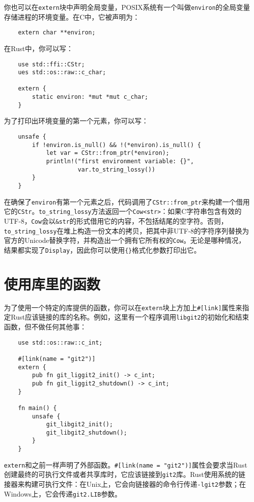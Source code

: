 你也可以在\texttt{extern}块中声明全局变量，POSIX系统有一个叫做\texttt{environ}的全局变量存储进程的环境变量。在C中，它被声明为：
\begin{verbatim}
    extern char **environ;
\end{verbatim}

在Rust中，你可以写：
\begin{verbatim}
    use std::ffi::CStr;
    ues std::os::raw::c_char;

    extern {
        static environ: *mut *mut c_char;
    }
\end{verbatim}

为了打印出环境变量的第一个元素，你可以写：
\begin{verbatim}
    unsafe {
        if !environ.is_null() && !(*environ).is_null() {
            let var = CStr::from_ptr(*environ);
            println!("first environment variable: {}",
                     var.to_string_lossy())
        }
    }
\end{verbatim}

在确保了\texttt{environ}有第一个元素之后，代码调用了\texttt{CStr::from\_ptr}来构建一个借用它的\texttt{CStr}。\texttt{to\_string\_lossy}方法返回一个\texttt{Cow<str>}：如果C字符串包含有效的UTF-8，\texttt{Cow}会以\texttt{\&str}的形式借用它的内容，不包括结尾的空字符。否则，\texttt{to\_string\_lossy}在堆上构造一份文本的拷贝，把其中非UTF-8的字符序列替换为官方的Unicode替换字符，并构造出一个拥有它所有权的\texttt{Cow}。无论是哪种情况，结果都实现了\texttt{Display}，因此你可以使用\texttt{\{\}}格式化参数打印出它。

\section{使用库里的函数}
为了使用一个特定的库提供的函数，你可以在\texttt{extern}块上方加上\texttt{\#[link]}属性来指定Rust应该链接的库的名称。例如，这里有一个程序调用\texttt{libgit2}的初始化和结束函数，但不做任何其他事：
\begin{verbatim}
    use std::os::raw::c_int;

    #[link(name = "git2")]
    extern {
        pub fn git_liggit2_init() -> c_int;
        pub fn git_liggit2_shutdown() -> c_int;
    }

    fn main() {
        unsafe {
            git_libgit2_init();
            git_libgit2_shutdown();
        }
    }
\end{verbatim}

\texttt{extern}和之前一样声明了外部函数。\texttt{\#[link(name = "git2")]}属性会要求当Rust创建最终的可执行文件或者共享库时，它应该链接到\texttt{git2}库。Rust使用系统的链接器来构建可执行文件：在Unix上，它会向链接器的命令行传递\texttt{-lgit2}参数；在Windows上，它会传递\texttt{git2.LIB}参数。

